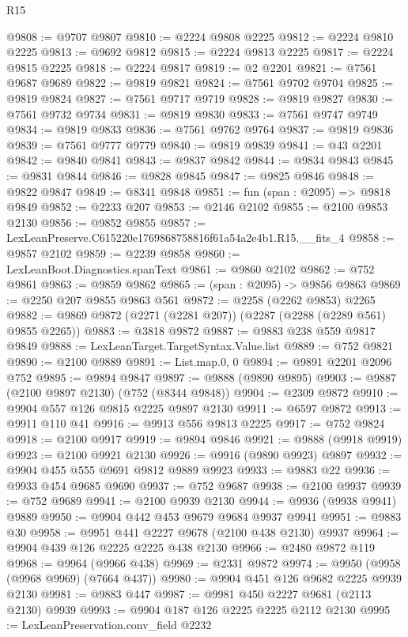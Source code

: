 \begin{lexlean}{R15}
\begin{coremodule}
@9808 := @9707 @9807
@9810 := @2224 @9808 @2225
@9812 := @2224 @9810 @2225
@9813 := @9692 @9812
@9815 := @2224 @9813 @2225
@9817 := @2224 @9815 @2225
@9818 := @2224 @9817
@9819 := @2 @2201
@9821 := @7561 @9687 @9689
@9822 := @9819 @9821
@9824 := @7561 @9702 @9704
@9825 := @9819 @9824
@9827 := @7561 @9717 @9719
@9828 := @9819 @9827
@9830 := @7561 @9732 @9734
@9831 := @9819 @9830
@9833 := @7561 @9747 @9749
@9834 := @9819 @9833
@9836 := @7561 @9762 @9764
@9837 := @9819 @9836
@9839 := @7561 @9777 @9779
@9840 := @9819 @9839
@9841 := @43 @2201
@9842 := @9840 @9841
@9843 := @9837 @9842
@9844 := @9834 @9843
@9845 := @9831 @9844
@9846 := @9828 @9845
@9847 := @9825 @9846
@9848 := @9822 @9847
@9849 := @8341 @9848
@9851 := fun (span : @2095) => @9818 @9849
@9852 := @2233 @207
@9853 := @2146 @2102
@9855 := @2100 @9853 @2130
@9856 := @9852 @9855
@9857 := LexLeanPreserve.C615220e1769868758816f61a54a2e4b1.R15.__fits_4
@9858 := @9857 @2102
@9859 := @2239 @9858
@9860 := LexLeanBoot.Diagnostics.spanText
@9861 := @9860 @2102
@9862 := @752 @9861
@9863 := @9859 @9862
@9865 := (span : @2095) -> @9856 @9863
@9869 := @2250 @207 @9855 @9863 @561
@9872 := @2258 (@2262 @9853) @2265
@9882 := @9869 @9872 (@2271 (@2281 @207)) (@2287 (@2288 (@2289 @561) @9855 @2265))
@9883 := @3818 @9872
@9887 := @9883 @238 @559 @9817 @9849
@9888 := LexLeanTarget.TargetSyntax.Value.list
@9889 := @752 @9821
@9890 := @2100 @9889
@9891 := List.map.{0, 0}
@9894 := @9891 @2201 @2096 @752
@9895 := @9894 @9847
@9897 := @9888 (@9890 @9895)
@9903 := @9887 (@2100 @9897 @2130) (@752 (@8344 @9848))
@9904 := @2309 @9872
@9910 := @9904 @557 @126 @9815 @2225 @9897 @2130
@9911 := @6597 @9872
@9913 := @9911 @110 @41
@9916 := @9913 @556 @9813 @2225
@9917 := @752 @9824
@9918 := @2100 @9917
@9919 := @9894 @9846
@9921 := @9888 (@9918 @9919)
@9923 := @2100 @9921 @2130
@9926 := @9916 (@9890 @9923) @9897
@9932 := @9904 @455 @555 @9691 @9812 @9889 @9923
@9933 := @9883 @22
@9936 := @9933 @454 @9685 @9690
@9937 := @752 @9687
@9938 := @2100 @9937
@9939 := @752 @9689
@9941 := @2100 @9939 @2130
@9944 := @9936 (@9938 @9941) @9889
@9950 := @9904 @442 @453 @9679 @9684 @9937 @9941
@9951 := @9883 @30
@9958 := @9951 @441 @2227 @9678 (@2100 @438 @2130) @9937
@9964 := @9904 @439 @126 @2225 @2225 @438 @2130
@9966 := @2480 @9872 @119
@9968 := @9964 (@9966 @438)
@9969 := @2331 @9872
@9974 := @9950 (@9958 (@9968 @9969) (@7664 @437))
@9980 := @9904 @451 @126 @9682 @2225 @9939 @2130
@9981 := @9883 @447
@9987 := @9981 @450 @2227 @9681 (@2113 @2130) @9939
@9993 := @9904 @187 @126 @2225 @2225 @2112 @2130
@9995 := LexLeanPreservation.conv_field @2232

\end{coremodule}
\end{lexlean}
